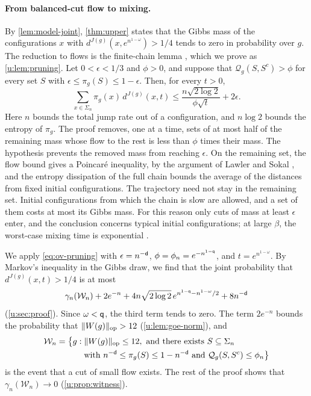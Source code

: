 \paragraph{From balanced-cut flow to mixing.} By \cref{lem:model-joint},
\cref{thm:upper} states that the Gibbs mass of the configurations $x$ with
$d^{J(g)}(x,e^{n^{1-\omega}})>1/4$ tends to zero in probability over $g$. The
reduction to flows is the finite-chain lemma
\cite[Lemma~8]{oai-typical-upper}, which we prove as \cref{u:lem:pruning}.
Let $0<\epsilon<1/3$ and $\phi>0$, and suppose that
$\mathcal Q_g(S,S^c)>\phi$ for every set $S$ with
$\epsilon\le\pi_g(S)\le1-\epsilon$. Then, for every $t>0$,
\begin{equation}\label{eq:ov-pruning}
 \sum_{x\in\Sigma_n}\pi_g(x)\,d^{J(g)}(x,t)
 \le\frac{n\sqrt{2\log2}}{\phi\sqrt t}+2\epsilon .
\end{equation}
Here $n$ bounds the total jump rate out of a configuration, and $n\log2$
bounds the entropy of $\pi_g$. The proof removes, one at a time, sets of at
most half of the remaining mass whose flow to the rest is less than $\phi$
times their mass. The hypothesis prevents the removed mass from reaching $\epsilon$.
On the remaining set, the flow bound gives a Poincar\'e inequality, by the
argument of Lawler and Sokal \cite[Theorem~3.5]{lawler-sokal-1988}, and the
entropy dissipation of the full chain
\cite[Lemmas~2.5 and~2.7]{diaconis-saloff-coste-1996} bounds the average of
the distances from fixed initial configurations. The trajectory need not
stay in the remaining set. Initial configurations from which the chain is
slow are allowed, and a set of them costs at most its Gibbs mass. For this
reason only cuts of mass at least $\epsilon$ enter, and the conclusion
concerns typical initial configurations; at large $\beta$, the worst-case
mixing time is exponential \cite[Theorem~1.1]{sellke-2025}.

We apply \eqref{eq:ov-pruning} with $\epsilon=n^{-\mathsf{d}}$,
$\phi=\phi_n=e^{-n^{1-\mathsf{q}}}$, and $t=e^{n^{1-\omega}}$. By Markov's inequality
in the Gibbs draw, we find that the joint probability that
$d^{J(g)}(x,t)>1/4$ is at most
\[
 \gamma_n(\mathcal W_n)+2e^{-n}
 +4n\sqrt{2\log2}\,e^{n^{1-\mathsf{q}}-n^{1-\omega}/2}+8n^{-\mathsf{d}}
\]
(\cref{u:sec:proof}). Since $\omega<\mathsf{q}$, the third term tends to zero.
The term $2e^{-n}$ bounds the probability that
$\lVert W(g)\rVert_{\rm op}>12$ (\cref{u:lem:goe-norm}), and
\[
 \begin{split}
 \mathcal W_n=\bigl\{g:{}&\lVert W(g)\rVert_{\rm op}\le12,\text{ and there exists }S
 \subseteq\Sigma_n\\
 &\text{with }n^{-\mathsf{d}}\le\pi_g(S)\le1-n^{-\mathsf{d}}\text{ and }
 \mathcal Q_g(S,S^c)\le\phi_n\bigr\}
 \end{split}
\]
is the event that a cut of small flow exists. The rest of the proof shows
that $\gamma_n(\mathcal W_n)\to0$ (\cref{u:prop:witness}).

